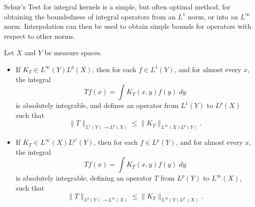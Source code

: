Schur's Test for integral kernels is a simple, but often optimal method, for obtaining the boundedness of integral operators from an $L^1$ norm, or into an $L^\infty$ norm. Interpolation can then be used to obtain simple bounds for operators with respect to other norms.

\begin{theorem}
    Let $X$ and $Y$ be measure spaces.
    \begin{itemize}
        \item If $K_T \in L^\infty(Y) L^p(X)$, then for each $f \in L^1(Y)$, and for almost every $x$, the integral
        \[ Tf(x) = \int K_T(x,y) f(y)\; dy \]
        is absolutely integrable, and defines an operator from $L^1(Y)$ to $L^p(X)$ such that
        \[ \| T \|_{L^1(Y) \to L^p(X)} \leq \| K_T \|_{L^\infty(X) L^p(Y)}. \]

        \item If $K_T \in L^\infty(X) L^{p'}(Y)$, then for each $f \in L^p(Y)$, and for almost every $x$, the integral
        \[ Tf(x) = \int K_T(x,y) f(y)\; dy \]
        is absolutely integrable, defining an operator $T$ from $L^p(Y)$ to $L^\infty(X)$, such that
        \[ \| T \|_{L^p(Y) \to L^\infty(X)} \leq \| K_T \|_{L^\infty(Y) L^{p'}(X)}. \]
    \end{itemize}
\end{theorem}

